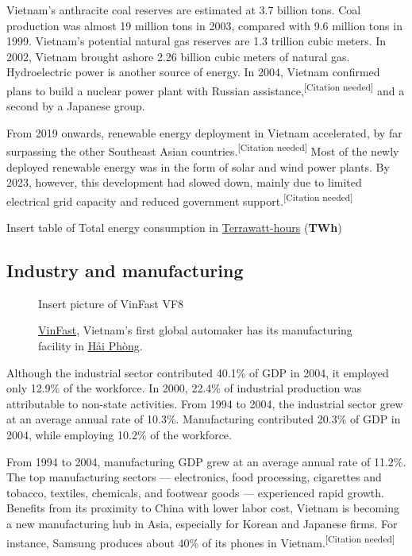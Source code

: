 \documentclass{article}
\begin{document}
Vietnam's anthracite coal reserves are estimated at 3.7 billion tons. Coal production was almost 19 million tons in 2003, compared with 9.6 million tons in 1999. Vietnam's potential natural gas reserves are 1.3 trillion cubic meters. In 2002, Vietnam brought ashore 2.26 billion cubic meters of natural gas. Hydroelectric power is another source of energy. In 2004, Vietnam confirmed plans to build a nuclear power plant with Russian assistance,\textsuperscript{[Citation needed]} and a second by a Japanese group.

From 2019 onwards, renewable energy deployment in Vietnam accelerated, by far surpassing the other Southeast Asian countries.\textsuperscript{[Citation needed]} Most of the newly deployed renewable energy was in the form of solar and wind power plants. By 2023, however, this development had slowed down, mainly due to limited electrical grid capacity and reduced government support.\textsuperscript{[Citation needed]}

\begin{table}
Insert table of Total energy consumption in \href{https://en.wikipedia.org/wiki/Terrawatt-hour}{Terrawatt-hours} (\textbf{TWh})
\end{table}

\subsection*{Industry and manufacturing}

\begin{figure}
    \begin{framed}
    Insert picture of VinFast VF8
    \caption*{\href{https://en.wikipedia.org/wiki/VinFast}{VinFast}, Vietnam's first global automaker has its manufacturing facility in \href{https://en.wikipedia.org/wiki/Haiphong}{Hải Phòng}.}
    \end{framed}
\end{figure}

Although the industrial sector contributed 40.1\% of GDP in 2004, it employed only 12.9\% of the workforce. In 2000, 22.4\% of industrial production was attributable to non-state activities. From 1994 to 2004, the industrial sector grew at an average annual rate of 10.3\%. Manufacturing contributed 20.3\% of GDP in 2004, while employing 10.2\% of the workforce.

From 1994 to 2004, manufacturing GDP grew at an average annual rate of 11.2\%. The top manufacturing sectors — electronics, food processing, cigarettes and tobacco, textiles, chemicals, and footwear goods — experienced rapid growth. Benefits from its proximity to China with lower labor cost, Vietnam is becoming a new manufacturing hub in Asia, especially for Korean and Japanese firms. For instance, Samsung produces about 40\% of its phones in Vietnam.\textsuperscript{[Citation needed]}
\end{document}
